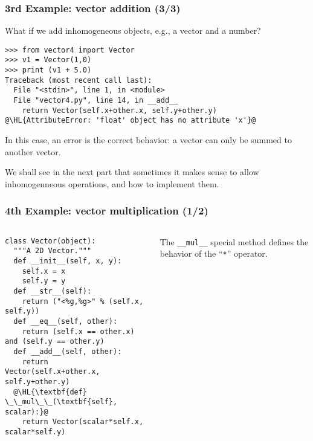\documentclass[english,serif,mathserif,xcolor=pdftex,dvipsnames,table]{beamer}
\begin{document}
\begin{frame}[fragile]
  \frametitle{3rd Example: vector addition (3/3)}

  What if we add inhomogeneous objects, e.g., a vector and a number?
\begin{lstlisting}
>>> from vector4 import Vector
>>> v1 = Vector(1,0)
>>> print (v1 + 5.0)
Traceback (most recent call last):
  File "<stdin>", line 1, in <module>
  File "vector4.py", line 14, in __add__
    return Vector(self.x+other.x, self.y+other.y)
@\HL{AttributeError: 'float' object has no attribute 'x'}@
\end{lstlisting}

  \+ In this case, an error is the correct behavior: a vector can only
  be summed to another vector.

  \+ We shall see in the next part that sometimes it makes sense to
  allow inhomogenneous operations, and how to implement them.
\end{frame}

\begin{frame}[fragile]
  \frametitle{4th Example: vector multiplication (1/2)}
  \begin{columns}[t]
    \begin{column}{0.5\textwidth}
      \begin{lstlisting}
class Vector(object):
  """A 2D Vector."""
  def __init__(self, x, y):
    self.x = x
    self.y = y
  def __str__(self):
    return ("<%g,%g>" % (self.x, self.y))
  def __eq__(self, other):
    return (self.x == other.x) and (self.y == other.y)
  def __add__(self, other):
    return Vector(self.x+other.x, self.y+other.y)
  @\HL{\textbf{def} \_\_mul\_\_(\textbf{self}, scalar):}@
    return Vector(scalar*self.x, scalar*self.y)
      \end{lstlisting}
    \end{column}
    \begin{column}{0.5\textwidth}
      \raggedleft
      The \lstinline|__mul__| special method defines the behavior of
      the ``\texttt{*}'' operator.
    \end{column}
  \end{columns}
\end{frame}

\end{document}
